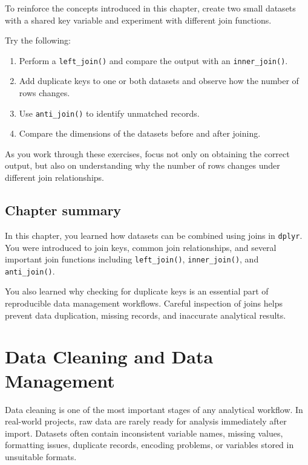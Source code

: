 \documentclass[
  11pt,
  oneside]{book}
\providecommand{\tightlist}{%
  \setlength{\itemsep}{0pt}\setlength{\parskip}{0pt}}
\begin{document}
To reinforce the concepts introduced in this chapter, create two small datasets with a shared key variable and experiment with different join functions.

Try the following:

\begin{enumerate}
\def\labelenumi{\arabic{enumi}.}
\tightlist
\item
  Perform a \texttt{left\_join()} and compare the output with an \texttt{inner\_join()}.
\item
  Add duplicate keys to one or both datasets and observe how the number of rows changes.
\item
  Use \texttt{anti\_join()} to identify unmatched records.
\item
  Compare the dimensions of the datasets before and after joining.
\end{enumerate}

As you work through these exercises, focus not only on obtaining the correct output, but also on understanding why the number of rows changes under different join relationships.

\section{Chapter summary}\label{chapter-summary-2}

In this chapter, you learned how datasets can be combined using joins in \texttt{dplyr}. You were introduced to join keys, common join relationships, and several important join functions including \texttt{left\_join()}, \texttt{inner\_join()}, and \texttt{anti\_join()}.

You also learned why checking for duplicate keys is an essential part of reproducible data management workflows. Careful inspection of joins helps prevent data duplication, missing records, and inaccurate analytical results.

\chapter{Data Cleaning and Data Management}\label{data-cleaning-and-data-management}

Data cleaning is one of the most important stages of any analytical workflow. In real-world projects, raw data are rarely ready for analysis immediately after import. Datasets often contain inconsistent variable names, missing values, formatting issues, duplicate records, encoding problems, or variables stored in unsuitable formats.
\end{document}
